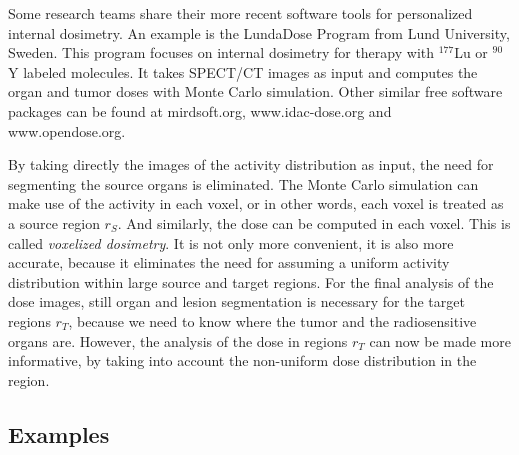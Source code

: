 \documentclass[11pt,oneside]{article}
\begin{document}
Some research teams share their more recent software tools for
personalized internal dosimetry. An example is the LundaDose Program
from Lund University, Sweden. This program focuses on internal
dosimetry for therapy with $^{177}$Lu or $^{90}$Y labeled
molecules. It takes SPECT/CT images as input and computes the organ
and tumor doses with Monte Carlo simulation. Other similar free
software packages can be found at mirdsoft.org, www.idac-dose.org and
www.opendose.org.

By taking directly the images of the activity distribution as input,
the need for segmenting the source organs is eliminated. The Monte
Carlo simulation can make use of the activity in each voxel, or in
other words, each voxel is treated as a source region $r_S$. And
similarly, the dose can be computed in each voxel. This is called {\em
  voxelized dosimetry}. It is not only more convenient, it is also
more accurate, because it eliminates the need for assuming a uniform
activity distribution within large source and target regions. For the
final analysis of the dose images, still organ and lesion segmentation
is necessary for the target regions $r_T$, because we need to know
where the tumor and the radiosensitive organs are. However, the
analysis of the dose in regions $r_T$ can now be made more
informative, by taking into account the non-uniform dose distribution
in the region.

\subsection{Examples}
\end{document}
